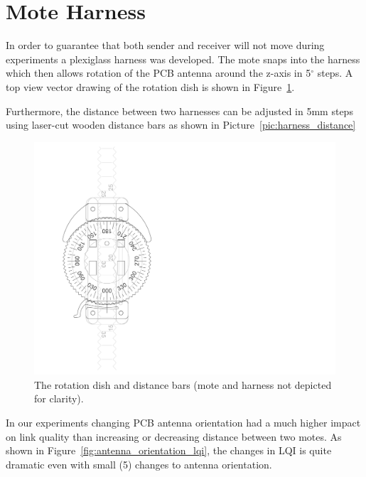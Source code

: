 \section{Mote Harness}

In order to guarantee that both sender and receiver will not move during experiments a plexiglass harness was developed.
The mote snaps into the harness which then allows rotation of the PCB antenna around the z-axis in 5$^\circ$ steps.
A top view vector drawing of the rotation dish is shown in Figure~\ref{fig:harness_vector}.

Furthermore, the distance between two harnesses can be adjusted in 5mm steps using laser-cut wooden distance bars as shown in Picture~\ref{pic:harness_distance}

\begin{figure}[H]
	\centering
    \includegraphics[trim = 20mm 20mm 120mm 25mm, clip, width=1\columnwidth, angle=90, scale=0.75]{figures/harness_vector_bar_2}
	\caption{The rotation dish and distance bars (mote and harness not depicted for clarity).}
    \label{fig:harness_vector}
\end{figure}

In our experiments changing PCB antenna orientation had a much higher impact on link quality than increasing or decreasing distance between two motes.
As shown in Figure~\ref{fig:antenna_orientation_lqi}, the changes in LQI is quite dramatic even with small (5) changes to antenna orientation.
